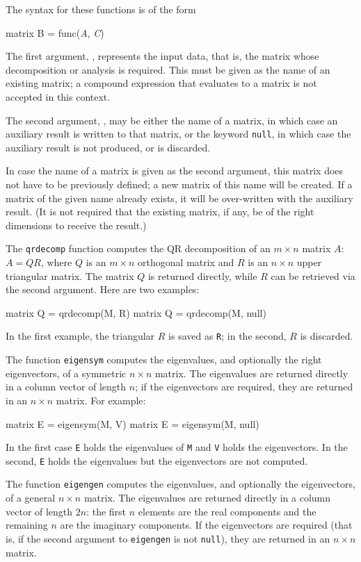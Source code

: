 The syntax for these functions is of the form
%
\begin{textcode}
matrix B = func(\textsl{A}, \textsl{C})
\end{textcode}
%
The first argument, , represents the input data, that is, the
matrix whose decomposition or analysis is required.  This must be
given as the name of an existing matrix; a compound expression that
evaluates to a matrix is not accepted in this context.

The second argument, , may be either the name of a matrix, in
which case an auxiliary result is written to that matrix, or the
keyword \texttt{null}, in which case the auxiliary result is not
produced, or is discarded.

In case the name of a matrix is given as the second argument, this
matrix does not have to be previously defined; a new matrix of this
name will be created.  If a matrix of the given name already exists,
it will be over-written with the auxiliary result.  (It is not
required that the existing matrix, if any, be of the right dimensions
to receive the result.)

The \texttt{qrdecomp} function computes the QR decomposition of an $m
\times n$ matrix $A$: $A = QR$, where $Q$ is an $m \times n$
orthogonal matrix and $R$ is an $n \times n$ upper triangular matrix.
The matrix $Q$ is returned directly, while $R$ can be retrieved via
the second argument.  Here are two examples:
%
\begin{code}
matrix Q = qrdecomp(M, R)
matrix Q = qrdecomp(M, null)
\end{code}
%
In the first example, the triangular $R$ is saved as \texttt{R}; in
the second, $R$ is discarded.

The function \texttt{eigensym} computes the eigenvalues, and
optionally the right eigenvectors, of a symmetric $n \times n$ matrix.
The eigenvalues are returned directly in a column vector of length
$n$; if the eigenvectors are required, they are returned in an $n
\times n$ matrix.  For example:
%
\begin{code}
matrix E = eigensym(M, V)
matrix E = eigensym(M, null)
\end{code}
%
In the first case \texttt{E} holds the eigenvalues of \texttt{M} and
\texttt{V} holds the eigenvectors.  In the second, \texttt{E} holds
the eigenvalues but the eigenvectors are not computed.

The function \texttt{eigengen} computes the eigenvalues, and
optionally the eigenvectors, of a general $n \times n$ matrix.  The
eigenvalues are returned directly in a column vector of length $2n$:
the first $n$ elements are the real components and the remaining $n$
are the imaginary components.  If the eigenvectors are required (that
is, if the second argument to \texttt{eigengen} is not \texttt{null}),
they are returned in an $n \times n$ matrix.

